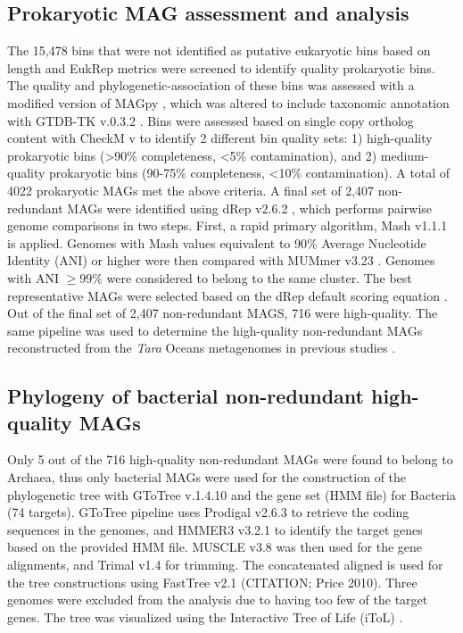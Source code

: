 \documentclass[12pt]{article}
\numberwithin{equation}{section}
\begin{document}
\subsection*{Prokaryotic MAG assessment and analysis} 
The 15,478 bins that were not identified as putative eukaryotic bins based on length and EukRep metrics were screened to identify quality prokaryotic bins. The quality and phylogenetic-association of these bins was assessed with a modified version of MAGpy \citep{Stewart2019MAGpy}, which was altered to include taxonomic annotation with GTDB-TK v.0.3.2 \citep{Chaumeil_2019}. Bins were assessed based on single copy ortholog content with CheckM v \citep{Parks2015CheckM} to identify 2 different bin quality sets: 1) high-quality prokaryotic bins (>90\% completeness, <5\% contamination), and 2) medium-quality prokaryotic bins (90-75\% completeness, <10\% contamination). A total of 4022 prokaryotic MAGs met the above criteria. A final set of 2,407 non-redundant MAGs were identified using dRep v2.6.2 \citep{Olm_2017}, which performs pairwise genome comparisons in two steps. First, a rapid primary algorithm, Mash v1.1.1 \citep{Ondov_2016} is applied. Genomes with Mash values equivalent to 90\% Average Nucleotide Identity (ANI) or higher were then compared with MUMmer v3.23 \citep{Mar_ais_2018}. Genomes with ANI $\geq99\%$ were considered to belong to the same cluster. The best representative MAGs were selected based on the dRep default scoring equation \citep{Olm_2017}. Out of the final set of 2,407 non-redundant MAGS, 716 were high-quality. The same pipeline was used to determine the high-quality non-redundant MAGs reconstructed from the \textit{Tara} Oceans metagenomes in previous studies \citep{Tully2018reconstruction, Parks2017Recovery, Delmont2018Nitrogen-fixing}. 

\subsection*{Phylogeny of bacterial non-redundant high-quality MAGs}
Only 5 out of the 716 high-quality non-redundant MAGs were found to belong to Archaea, thus only bacterial MAGs were used for the construction of the phylogenetic tree with GToTree v.1.4.10 \citep{Lee_2019} and the gene set (HMM file) for Bacteria (74 targets). GToTree pipeline uses Prodigal v2.6.3 \citep{Hyatt_2010} to retrieve the coding sequences in the genomes, and HMMER3 v3.2.1 \citep{Eddy_2011} to identify the target genes based on the provided HMM file. MUSCLE v3.8 \citep{Edgar_2004} was then used for the gene alignments, and Trimal v1.4  \citep{Capella_Gutierrez_2009} for trimming. The concatenated aligned is used for the tree constructions using FastTree v2.1 (CITATION; Price 2010). Three genomes were excluded from the analysis due to having too few of the target genes. The tree was visualized using the Interactive Tree of Life (iToL) \citep{Letunic2016Interactive}.
\end{document}
